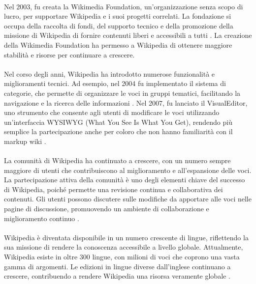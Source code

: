 \documentclass[12pt,a4paper]{report}
\begin{document}
\paragraph*{}
Nel 2003, fu creata la Wikimedia Foundation, un'organizzazione senza scopo di lucro, per supportare Wikipedia e i suoi progetti correlati. La fondazione si occupa della raccolta di fondi, del supporto tecnico e della promozione della missione di Wikipedia di fornire contenuti liberi e accessibili a tutti \cite{reagle2010good}. La creazione della Wikimedia Foundation ha permesso a Wikipedia di ottenere maggiore stabilità e risorse per continuare a crescere.
\paragraph*{}
Nel corso degli anni, Wikipedia ha introdotto numerose funzionalità e miglioramenti tecnici. Ad esempio, nel 2004 fu implementato il sistema di categorie, che permette di organizzare le voci in gruppi tematici, facilitando la navigazione e la ricerca delle informazioni \cite{jemielniak2014wikipedia}. Nel 2007, fu lanciato il VisualEditor, uno strumento che consente agli utenti di modificare le voci utilizzando un'interfaccia WYSIWYG (What You See Is What You Get), rendendo più semplice la partecipazione anche per coloro che non hanno familiarità con il markup wiki \cite{history_of_wikis}.
\paragraph*{}
La comunità di Wikipedia ha continuato a crescere, con un numero sempre maggiore di utenti che contribuiscono al miglioramento e all'espansione delle voci. La partecipazione attiva della comunità è uno degli elementi chiave del successo di Wikipedia, poiché permette una revisione continua e collaborativa dei contenuti. Gli utenti possono discutere sulle modifiche da apportare alle voci nelle pagine di discussione, promuovendo un ambiente di collaborazione e miglioramento continuo \cite{denning2005wikipedia}.
\paragraph*{}
Wikipedia è diventata disponibile in un numero crescente di lingue, riflettendo la sua missione di rendere la conoscenza accessibile a livello globale. Attualmente, Wikipedia esiste in oltre 300 lingue, con milioni di voci che coprono una vasta gamma di argomenti. Le edizioni in lingue diverse dall'inglese continuano a crescere, contribuendo a rendere Wikipedia una risorsa veramente globale \cite{reagle2010good}.
\end{document}
